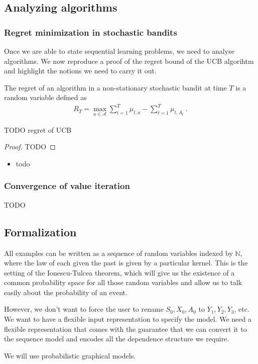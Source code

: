 \subsection{Analyzing algorithms}
\label{sub:analyzing_algorithms}

\subsubsection{Regret minimization in stochastic bandits}
\label{subs:regret_minimization_in_stochastic_bandits}

Once we are able to state sequential learning problems, we need to analyse algorithms. We now reproduce a proof of the regret bound of the UCB algorihtm and highlight the notions we need to carry it out.

\begin{definition}
The regret of an algorithm in a non-stationary stochastic bandit at time $T$ is a random variable defined as
\begin{align*}
R_T = \max_{a \in \mathcal A} \sum_{t=1}^T \mu_{t, a} - \sum_{t=1}^T \mu_{t, A_t} \: .
\end{align*}
\end{definition}

\begin{theorem}
TODO regret of UCB
\end{theorem}
\begin{proof}
TODO
\end{proof}

\begin{remark}
\begin{itemize}
    \item todo
\end{itemize}
\end{remark}

\subsubsection{Convergence of value iteration}
\label{ssub:convergence_of_value_iteration}

TODO

\subsection{Formalization}

All examples can be written as a sequence of random variables indexed by $\mathbb{N}$, where the law of each given the past is given by a particular kernel. This is the setting of the Ionescu-Tulcea theorem, which will give us the existence of a common probability space for all those random variables and allow us to talk easily about the probability of an event. 

However, we don't want to force the user to rename $S_0, X_0, A_0$ to $Y_1, Y_2, Y_3$, etc. We want to have a flexible input representation to specify the model. We need a flexible representation that comes with the guarantee that we can convert it to the sequence model and encodes all the dependence structure we require.

We will use probabilistic graphical models.


